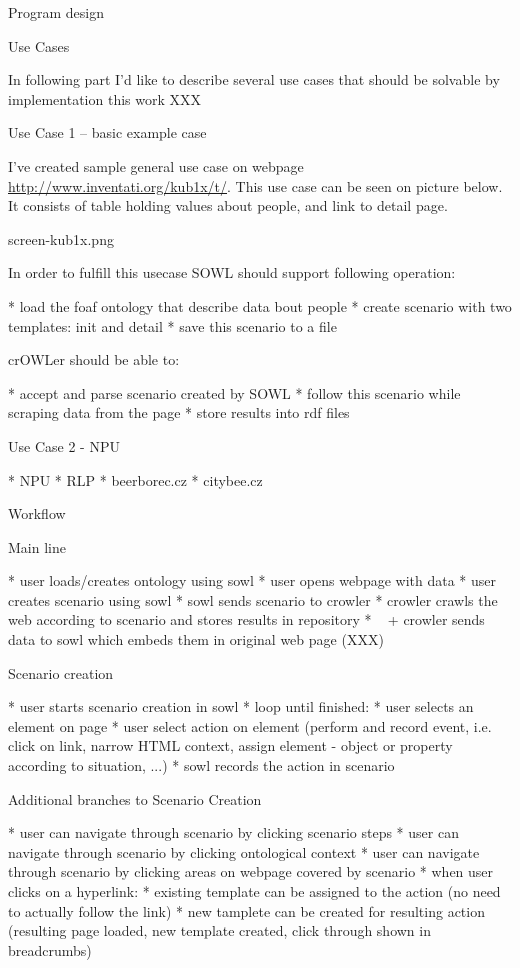 
\chap Program design


\sec Use Cases

In following part I'd like to describe several use cases that should be solvable by implementation this work XXX


\secc Use Case 1 -- basic example case

I've created sample general use case on webpage
\url{http://www.inventati.org/kub1x/t/}. This use case can be seen on picture
below. It consists of table holding values about people, and link to detail
page.

\cinspic screen-kub1x.png

In order to fulfill this usecase SOWL should support following operation: 

\begitems
  * load the foaf ontology that describe data bout people
  * create scenario with two templates: init and detail
  * save this scenario to a file
\enditems

crOWLer should be able to: 

\begitems
  * accept and parse scenario created by SOWL
  * follow this scenario while scraping data from the page
  * store results into rdf files
\enditems


\secc Use Case 2 - NPU



\begitems
  * NPU
  * RLP
  * beerborec.cz
  * citybee.cz
\enditems



\sec Workflow

\secc Main line

\begitems
  * user loads/creates ontology using sowl
  * user opens webpage with data
  * user creates scenario using sowl
  * sowl sends scenario to crowler
  * crowler crawls the web according to scenario and stores results in repository
  * ~ + crowler sends data to sowl which embeds them in original web page (XXX)
\enditems


\secc Scenario creation

\begitems
  * user starts scenario creation in sowl
  * loop until finished:
  \begitems
    * user selects an element on page
    * user select action on element (perform and record event, i.e. click on link, narrow HTML context, assign element - object or property according to situation, ...)
    * sowl records the action in scenario
  \enditems
\enditems


\secc Additional branches to Scenario Creation

\begitems
  * user can navigate through scenario by clicking scenario steps
  * user can navigate through scenario by clicking ontological context
  * user can navigate through scenario by clicking areas on webpage covered by scenario
  * when user clicks on a hyperlink: 
  \begitems
    * existing template can be assigned to the action (no need to actually follow the link)
    * new tamplete can be created for resulting action (resulting page loaded, new template created, click through shown in breadcrumbs)
  \enditems
\enditems



